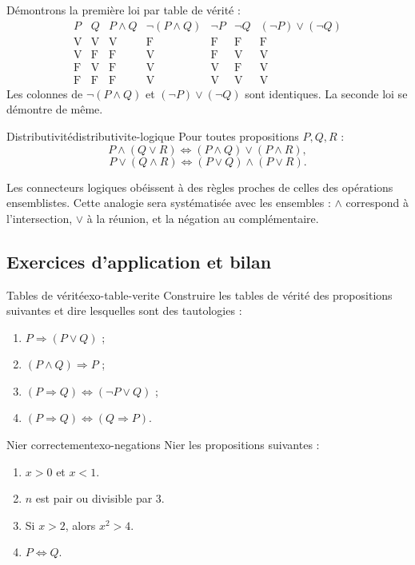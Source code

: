 \documentclass[11pt,a4paper]{article}
\newcommand{\V}{\mathrm{V}}
\newcommand{\F}{\mathrm{F}}
\begin{document}
\begin{preuvebox}
Démontrons la première loi par table de vérité :
\[
\begin{array}{c|c|c|c|c|c|c}
P&Q&P\land Q&\neg(P\land Q)&\neg P&\neg Q&(\neg P)\lor(\neg Q)\\
\hline
\V&\V&\V&\F&\F&\F&\F\\
\V&\F&\F&\V&\F&\V&\V\\
\F&\V&\F&\V&\V&\F&\V\\
\F&\F&\F&\V&\V&\V&\V
\end{array}
\]
Les colonnes de $\neg(P\land Q)$ et $(\neg P)\lor(\neg Q)$ sont identiques. La seconde loi se démontre de même.
\end{preuvebox}

\begin{propositionbox}{Distributivité}{distributivite-logique}
Pour toutes propositions $P,Q,R$ :
\[
P\land(Q\lor R)\Longleftrightarrow (P\land Q)\lor(P\land R),
\]
\[
P\lor(Q\land R)\Longleftrightarrow (P\lor Q)\land(P\lor R).
\]
\end{propositionbox}

\begin{retenirbox}
Les connecteurs logiques obéissent à des règles proches de celles des opérations ensemblistes. Cette analogie sera systématisée avec les ensembles : $\land$ correspond à l'intersection, $\lor$ à la réunion, et la négation au complémentaire.
\end{retenirbox}

\subsection{Exercices d'application et bilan}

\begin{exercicebox}{Tables de vérité}{exo-table-verite}
Construire les tables de vérité des propositions suivantes et dire lesquelles sont des tautologies :
\begin{enumerate}
  \item $P\Rightarrow(P\lor Q)$ ;
  \item $(P\land Q)\Rightarrow P$ ;
  \item $(P\Rightarrow Q)\Longleftrightarrow(\neg P\lor Q)$ ;
  \item $(P\Rightarrow Q)\Longleftrightarrow(Q\Rightarrow P)$.
\end{enumerate}
\end{exercicebox}

\begin{exercicebox}{Nier correctement}{exo-negations}
Nier les propositions suivantes :
\begin{enumerate}
  \item $x>0$ et $x<1$.
  \item $n$ est pair ou divisible par $3$.
  \item Si $x>2$, alors $x^2>4$.
  \item $P\Longleftrightarrow Q$.
\end{enumerate}
\end{exercicebox}
\end{document}
